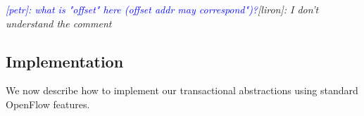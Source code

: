 \documentclass[conference]{sigcomm-alternate}
\newcommand{\liron}[1]{\textit{\textcolor{mygreen}{[liron]: #1}}} %
\newcommand{\petr}[1]{\textit{\textcolor{blue}{[petr]: #1}}} %
\begin{document}

\petr{what is "offset" here (offset addr may correspond")?}\liron{I don't understand the comment}

\subsection{Implementation}\label{sec:t-impl}

We now describe how to implement our transactional
abstractions using standard OpenFlow features.
\end{document}

